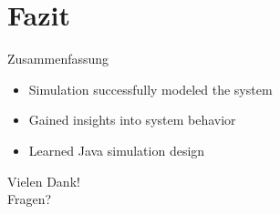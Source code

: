 \documentclass{beamer}
\begin{document}
    \section{Fazit}
    \begin{frame}{Zusammenfassung}
        \begin{itemize}
            \item Simulation successfully modeled the system
            \item Gained insights into system behavior
            \item Learned Java simulation design
        \end{itemize}
    \end{frame}

    \begin{frame}[standout]
        Vielen Dank!\\
        Fragen?
    \end{frame}
\end{document}
